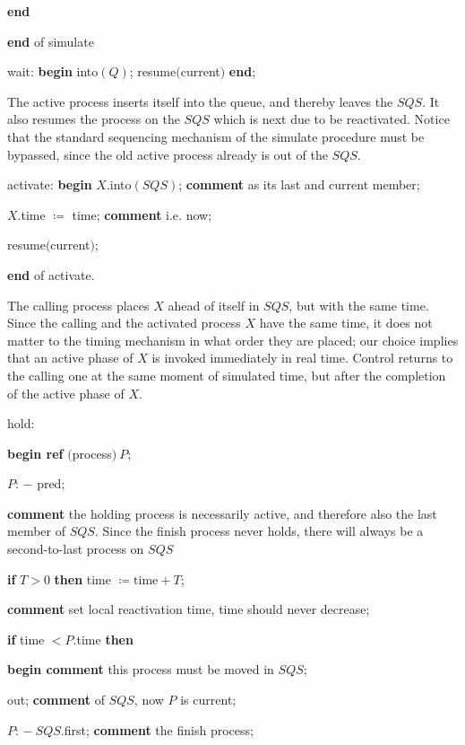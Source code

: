 \quad \quad \quad \quad \textbf{end}

\quad \quad \textbf{end} of simulate

\quad wait: \textbf{begin} into$(Q)$; resume$($current$)$ \textbf{end};

\noindent
The active process inserts itself into the queue, and thereby leaves the $SQS$. It also resumes the process on the $SQS$ which is next due to be reactivated. Notice that the standard sequencing mechanism of the simulate procedure must be bypassed, since the old active process already is out of the $SQS$.

\quad activate: \textbf{begin} $X$.into$(SQS)$; \textbf{comment} as its last and current member;

\quad \quad $X$.time $\coloneq$ time; \textbf{comment} i.e. now;

\quad \quad resume$($current$)$;

\quad \textbf{end} of activate.

\noindent
The calling process places $X$ ahead of itself in $SQS$, but with the same time. Since the calling and the activated process $X$ have the same time, it does not matter to the timing mechanism in what order they are placed; our choice implies that an active phase of $X$ is invoked immediately in real time. Control returns to the calling one at the same moment of simulated time, but after the completion of the active phase of $X$.

\quad hold:

\quad \textbf{begin ref} $($process$)\ P$;

\quad \quad $P$: $-$ pred;

\parindent\quad \quad \textbf{comment} the holding process is necessarily active, and therefore also the last member of $SQS$. Since the finish process never holds, there will always be a second-to-last process on $SQS$

\quad \quad \textbf{if} $T > 0$ \textbf{then} time $\coloneq \text{time} + T$;

\quad \quad \textbf{comment} set local reactivation time, time should never decrease;

\quad \quad \textbf{if} time $< P$.time \textbf{then}

\quad \quad \quad \textbf{begin comment} this process must be moved in $SQS$;

\quad \quad \quad \quad out; \textbf{comment} of $SQS$, now $P$ is current;

\quad \quad \quad \quad $P$: $-\ SQS$.first; \textbf{comment} the finish process;

